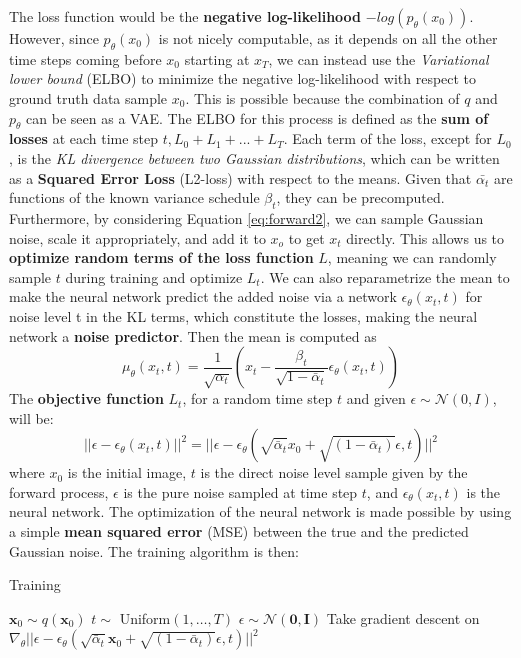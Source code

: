 \documentclass[preprint]{elsarticle}
\begin{document}
The loss function would be the \textbf{negative log-likelihood} $-log(p_\theta(x_0))$. 
However, since $p_\theta(x_0)$ is not nicely computable, as it depends on all the other time steps coming before 
$x_0$ starting at $x_T$, we can instead use the \emph{Variational lower bound} (ELBO) 
to minimize the negative log-likelihood with respect to ground truth data sample $x_0$.
This is possible because the combination of $q$ and $p_\theta$ can be seen as a VAE.
The ELBO for this process is defined as the \textbf{sum of losses} at each time step $t,L_0+L_1+...+L_T$.
Each term of the loss, except for $L_0$, is the \emph{KL divergence between two Gaussian distributions},
which can be written as a \textbf{Squared Error Loss} (L2-loss) with respect to the means.
Given that $\bar{\alpha_t}$ are functions of the known variance schedule $\beta_t$, they can be precomputed.
Furthermore, by considering Equation \ref{eq:forward2}, we can sample Gaussian noise, 
scale it appropriately, and add it to $x_o$ to  get $x_t$ directly. This allows us
to \textbf{optimize random terms of the loss function} $L$, meaning we can randomly sample $t$ during training
and optimize $L_t$.
We can also reparametrize the mean to make the neural network predict
the added noise via a network $\epsilon_\theta(x_t,t)$ for noise level t in the KL terms, which
constitute the losses, making the neural network a \textbf{noise predictor}.
Then the mean is computed as \cite{weng2021diffusion}
\begin{equation}
	\mu_\theta(x_t,t) =\frac{1}{\sqrt{\alpha_t}}\left(x_t - \frac{\beta_t}{\sqrt{1-\bar{\alpha}_t}}\epsilon_\theta(x_t,t)\right)
\end{equation}
The \textbf{objective function} $L_t$, for a random time step $t$ and given $\epsilon \sim \mathcal{N}(0,I)$,
will be:
\begin{equation}
	||\epsilon-\epsilon_\theta(x_t,t)||^2 = ||\epsilon - \epsilon_\theta
	(\sqrt{\bar{\alpha}_t}x_0 + \sqrt{(1-\bar{\alpha}_t)}\epsilon,t) ||^2
\end{equation}
where $x_0$ is the initial image, $t$ is the direct noise level sample given by the
forward process, $\epsilon$ is the pure noise sampled at time step $t$, and 
$\epsilon_\theta(x_t,t)$ is the neural network. The optimization of the neural network is made possible 
by using a simple \textbf{mean squared error} (MSE) between the true and the predicted Gaussian noise. The training algorithm is then:

\begin{algorithm}
    \caption{Training}\label{alg:training}
    \begin{algorithmic}[1]
    \Repeat
        \State $\mathbf{x}_0 \sim q(\mathbf{x}_0)$
        \State $t \sim$ Uniform$({1,\ldots,T})$
        \State $\epsilon \sim \mathcal{N}(\mathbf{0},\mathbf{I})$ 
        \State Take gradient descent on 
        $\nabla_\theta||\epsilon - \epsilon_\theta
	(\sqrt{\bar{\alpha}_t}\mathbf{x}_0 + \sqrt{(1-\bar{\alpha}_t)}\epsilon,t) ||^2$
    \end{algorithmic}
\end{algorithm}
\end{document}
